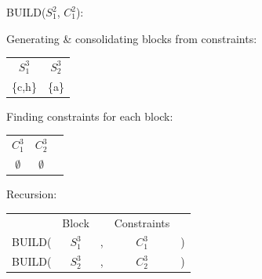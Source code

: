 \documentclass[11pt]{article} %
\begin{document}
	\hspace{0.5cm}BUILD($S_1^2$, $C_1^2$):
		\begin{center}
		Generating \& consolidating blocks from constraints:
		
		\begin{tabular}{c c}
			\hspace{0.8cm}$S_1^3$\hspace{0.8cm} & \hspace{0.8cm}$S_2^3$\hspace{0.8cm} \\
			\{c,h\} & \{a\}
		\end{tabular}
	
		Finding constraints for each block:
		
		\begin{tabular}{c c c}
			\hspace{0.8cm}$C_1^3$\hspace{0.8cm} & \hspace{0.8cm}$C_2^3$\hspace{0.8cm} \\
			$\emptyset$ & $\emptyset$
		\end{tabular}

		Recursion:
		
		\begin{tabular}{c c c c c}
			 & Block & & Constraints & \\
			BUILD( & $S_1^3$ & , & $C_1^3$ & ) \\
			BUILD( & $S_2^3$ & , & $C_2^3$ & )
		\end{tabular}
		\end{center}
\end{document}
